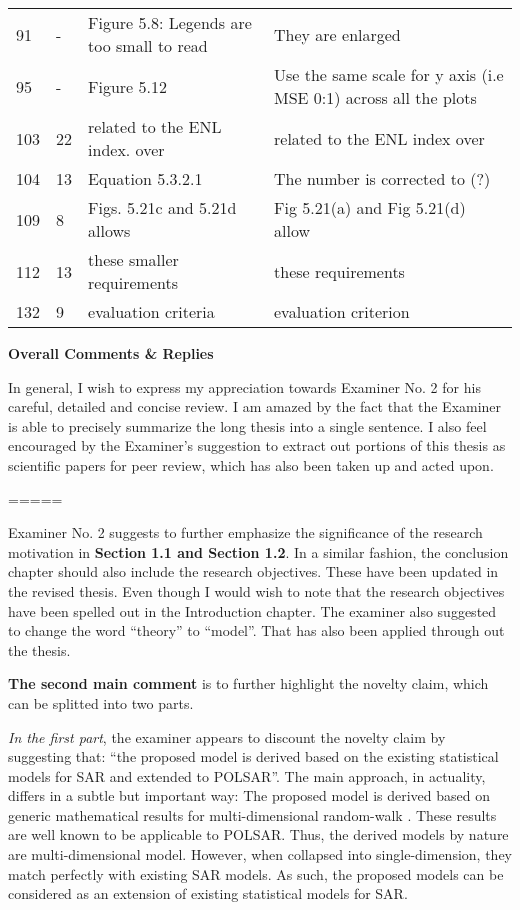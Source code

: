 \begin{longtable}[c]{p{}|p{}|p{}|p{}}
91 & - & Figure 5.8: Legends are too small to read & They are enlarged \\
95 & - & Figure 5.12 & Use the same scale for  y axis (i.e MSE 0:1) across all the plots \\
103 & 22 & related to the ENL index. over & related to the ENL index over \\
104 & 13 & Equation 5.3.2.1 & The number is corrected to (?) \\
109 & 8 & Figs. 5.21c and 5.21d allows & Fig 5.21(a) and Fig 5.21(d) allow \\
112 & 13 & these smaller requirements & these requirements \\
132 & 9 & evaluation criteria & evaluation criterion
\end{longtable}    

\textbf{Overall Comments \& Replies}

In general, I wish to express my appreciation towards Examiner No. 2 for his careful, detailed and concise review.
I am amazed by the fact that the Examiner is able to precisely summarize the long thesis into a single sentence.
I also feel encouraged by the Examiner's suggestion to extract out portions of this thesis as scientific papers for peer review, which has also been taken up and acted upon.

=====

Examiner No. 2 suggests to further emphasize the significance of the research motivation in \textbf{Section 1.1 and Section 1.2}.
In a similar fashion, the conclusion chapter should also include the research objectives.
These have been updated in the revised thesis.
Even though I would wish to note that the research objectives have been spelled out in the Introduction chapter.
The examiner also suggested to change the word ``theory'' to ``model''.
That has also been applied through out the thesis.

\textbf{The second main comment} is to further highlight the novelty claim, which can be splitted into two parts.

\textit{In the first part}, the examiner appears to discount the novelty claim by suggesting that:
 ``the proposed model is derived based on the existing statistical models for SAR and extended to POLSAR''.
The main approach, in actuality, differs in a subtle but important way:
The proposed model is derived based on generic mathematical results for multi-dimensional random-walk \cite{Goodman_JOptSocAm_76, Goodman_Springer_1975}.
These results are well known to be applicable to POLSAR.
Thus, the derived models by nature are multi-dimensional model.
However, when collapsed into single-dimension, they match perfectly with existing SAR models.
As such, the proposed models can be considered as an extension of existing statistical models for SAR.

